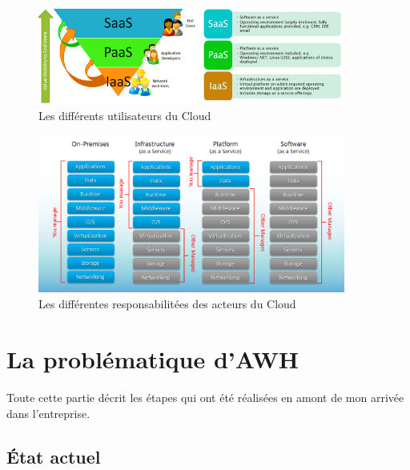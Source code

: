 \subsection*{} %

\begin{figure}[H]
\centering
\includegraphics[width=0.9\textwidth]{resource/img/clouds-users}
\caption{Les différents utilisateurs du Cloud}
\end{figure}

\begin{figure}[H]
\centering
\includegraphics[width=0.9\textwidth]{resource/img/clouds-responsabilities}
\caption{Les différentes responsabilitées des acteurs du Cloud}
\end{figure}

\section{La problématique d'AWH}

\paragraph*{}
Toute cette partie décrit les étapes qui ont été réalisées en amont de mon arrivée dans l'entreprise.

\subsection{État actuel}
